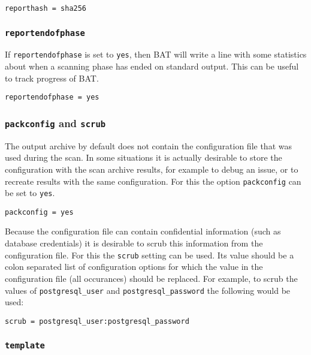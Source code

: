 \documentclass[10pt,a4paper]{article}
\begin{document}
\begin{verbatim}
reporthash = sha256
\end{verbatim}

\subsubsection{\texttt{reportendofphase}}

If \texttt{reportendofphase} is set to \texttt{yes}, then BAT will write a
line with some statistics about when a scanning phase has ended on standard
output. This can be useful to track progress of BAT.

\begin{verbatim}
reportendofphase = yes
\end{verbatim}

\subsubsection{\texttt{packconfig} and \texttt{scrub}}

The output archive by default does not contain the configuration file that was
used during the scan. In some situations it is actually desirable to store the
configuration with the scan archive results, for example to debug an issue, or
to recreate results with the same configuration. For this the option
\texttt{packconfig} can be set to \texttt{yes}.

\begin{verbatim}
packconfig = yes
\end{verbatim}

Because the configuration file can contain confidential information (such as
database credentials) it is desirable to scrub this information from the
configuration file. For this the \texttt{scrub} setting can be used. Its value
should be a colon separated list of configuration options for which the value
in the configuration file (all occurances) should be replaced. For example, to
scrub the values of \texttt{postgresql\_user} and \texttt{postgresql\_password}
the following would be used:

\begin{verbatim}
scrub = postgresql_user:postgresql_password
\end{verbatim}

\subsubsection{\texttt{template}}
\end{document}
